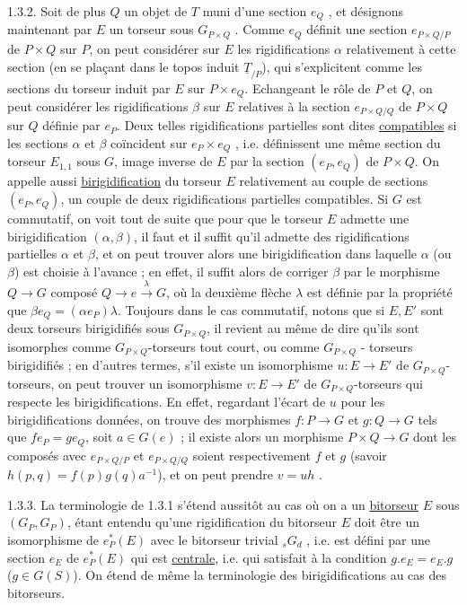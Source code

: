 1.3.2.  Soit de plus $Q$ un objet de \underline{$T$} muni d'une section $e_Q$ , et désignons maintenant par $E$ un torseur sous $G_{P\times Q}$ . Comme $e_Q$ définit une section $e_{P\times Q/P}$ de $P\times Q$ sur $P$, on peut considérer sur $E$ les rigidifications $\alpha$ relativement à cette section (en se plaçant dans le topos induit $\underline{T}_{/P}$), qui s'explicitent comme les sections du torseur induit par $E$ sur $P\times e_Q$. Echangeant le rôle de $P$ et $Q$, on peut considérer les rigidifications $\beta$ sur $E$ relatives à la section $e_{P\times Q/Q}$ de $P\times Q$ sur $Q$ définie par $e_P$. Deux telles rigidifications partielles sont dites \underline{compatibles} si les sections $\alpha$ et $\beta$ coïncident sur $e_P\times e_Q$ , i.e. définissent une même section du torseur $E_{1,1}$ sous $G$, image
inverse de $E$ par la section $(e_P,e_Q)$ de $P\times Q$. On appelle aussi \underline{birigidification} du torseur $E$ relativement au couple de sections $(e_P,e_Q)$, un couple de deux rigidifications partielles compatibles. Si $G$ est commutatif, on voit tout de suite que pour que le torseur $E$ admette une birigidification $(\alpha,\beta)$, il faut et il suffit qu'il admette des rigidifications partielles $\alpha$ et $\beta$, et on peut trouver alors une birigidification dans laquelle $\alpha$ (ou $\beta$) est choisie à l'avance ; en effet, il suffit alors de corriger $\beta$ par le morphisme $Q \longrightarrow G$ composé $Q \longrightarrow e \xrightarrow{\lambda} G$, où la deuxième flèche $\lambda$ est définie par la propriété que $\beta e_Q = (\alpha e_P)\lambda$. Toujours dans le cas commutatif, notons que si $E,E'$ sont deux torseurs birigidifiés sous $G_{P\times Q}$, il revient au même de dire qu'ils sont isomorphes comme $G_{P\times Q}$-torseurs tout court, ou comme $G_{P\times Q}$ - torseurs birigidifiés ; en d'autres termes, s'il existe un isomorphisme $u : E \longrightarrow E'$ de $G_{P\times Q}$-torseurs, on peut trouver un isomorphisme $v : E \longrightarrow E'$ de $G_{P\times Q}$-torseurs qui respecte les birigidifications. En effet, regardant l'écart de $u$ pour les birigidifications données, on trouve des morphismes $f:P \longrightarrow G$ et $g : Q \longrightarrow G$ tels que $fe_P=ge_Q$, soit $a \in G(e)$ ; il existe alors un morphisme $P\times Q \longrightarrow G$ dont les composés avec $e_{P\times Q/P}$ et $e_{P\times Q/Q}$ soient respectivement $f$ et $g$ (savoir $h(p,q) = f(p)g(q)a^{-1}$), et on peut prendre $v = uh$ .

1.3.3.  La terminologie de 1.3.1 s'étend aussitôt au cas où on a un \underline{bitorseur} $E$ sous $(G_P,G_P)$, étant entendu qu'une rigidification du bitorseur $E$ doit être un isomorphisme de $e_P^*(E)$ avec le bitorseur trivial $_sG_d$ , i.e. est défini par une section $e_E$ de $e_P^*(E)$ qui est \underline{centrale}, i.e. qui satisfait à la condition $g.e_E = e_E.g$ ($g \in G(S)$). On étend de même la terminologie des
birigidifications au cas des bitorseurs.

